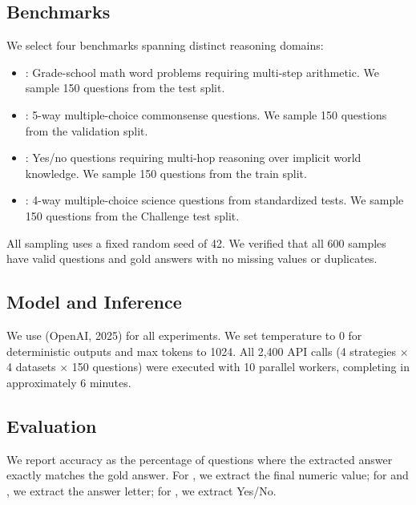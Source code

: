\subsection{Benchmarks}
\label{sec:benchmarks}

We select four benchmarks spanning distinct reasoning domains:

\begin{itemize}[leftmargin=*,itemsep=2pt,topsep=2pt]
\item \textbf{\gsm} \citep{cobbe2021gsm8k}: Grade-school math word problems requiring multi-step arithmetic. We sample 150 questions from the test split.
\item \textbf{\csqa} \citep{talmor2019commonsenseqa}: 5-way multiple-choice commonsense questions. We sample 150 questions from the validation split.
\item \textbf{\strategyqa} \citep{geva2021strategyqa}: Yes/no questions requiring multi-hop reasoning over implicit world knowledge. We sample 150 questions from the train split.
\item \textbf{\arc} \citep{clark2018arc}: 4-way multiple-choice science questions from standardized tests. We sample 150 questions from the Challenge test split.
\end{itemize}

All sampling uses a fixed random seed of 42. We verified that all 600 samples have valid questions and gold answers with no missing values or duplicates.

\subsection{Model and Inference}
\label{sec:model}

We use \gptfour (OpenAI, 2025) for all experiments. We set temperature to 0 for deterministic outputs and max tokens to 1024. All 2,400 API calls (4 strategies $\times$ 4 datasets $\times$ 150 questions) were executed with 10 parallel workers, completing in approximately 6 minutes.

\subsection{Evaluation}
\label{sec:eval}

 We report accuracy as the percentage of questions where the extracted answer exactly matches the gold answer. For \gsm, we extract the final numeric value; for \csqa and \arc, we extract the answer letter; for \strategyqa, we extract Yes/No.

